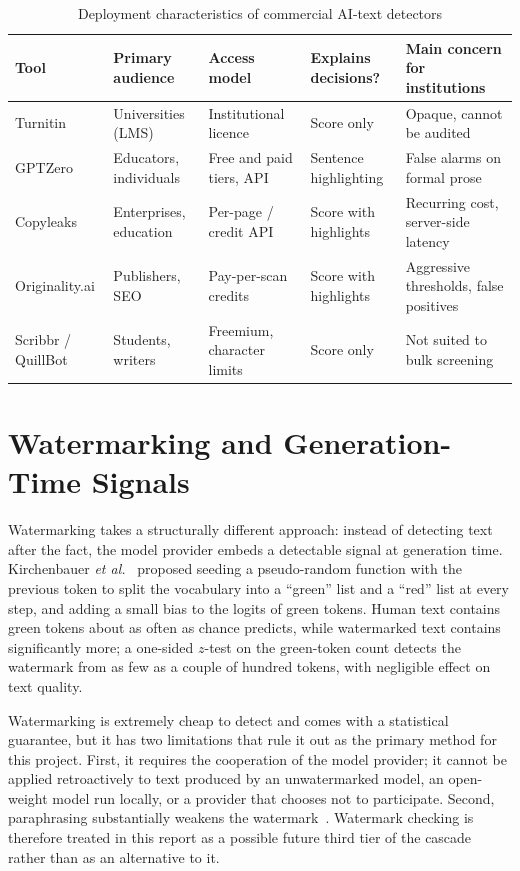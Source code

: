 \begin{table}[H]
\caption{Deployment characteristics of commercial AI-text detectors}
\label{tab:lit-commercial}
\centering
\small
\begin{tabularx}{\textwidth}{|p{2.6cm}|L|L|L|L|}
\hline
\textbf{Tool} & \textbf{Primary audience} & \textbf{Access model} & \textbf{Explains decisions?} & \textbf{Main concern for institutions} \\ \hline
Turnitin & Universities (LMS) & Institutional licence & Score only & Opaque, cannot be audited \\ \hline
GPTZero & Educators, individuals & Free and paid tiers, API & Sentence highlighting & False alarms on formal prose \\ \hline
Copyleaks & Enterprises, education & Per-page / credit API & Score with highlights & Recurring cost, server-side latency \\ \hline
Originality.ai & Publishers, SEO & Pay-per-scan credits & Score with highlights & Aggressive thresholds, false positives \\ \hline
Scribbr / QuillBot & Students, writers & Freemium, character limits & Score only & Not suited to bulk screening \\ \hline
\end{tabularx}
\end{table}

\section{Watermarking and Generation-Time Signals}

Watermarking takes a structurally different approach: instead of detecting
text after the fact, the model provider embeds a detectable signal at
generation time. Kirchenbauer \textit{et al.}~\cite{kirchenbauer2023watermark}
proposed seeding a pseudo-random function with the previous token to split
the vocabulary into a ``green'' list and a ``red'' list at every step, and
adding a small bias to the logits of green tokens. Human text contains green
tokens about as often as chance predicts, while watermarked text contains
significantly more; a one-sided $z$-test on the green-token count detects the
watermark from as few as a couple of hundred tokens, with negligible effect on
text quality.

Watermarking is extremely cheap to detect and comes with a statistical
guarantee, but it has two limitations that rule it out as the primary method
for this project. First, it requires the cooperation of the model provider;
it cannot be applied retroactively to text produced by an unwatermarked model,
an open-weight model run locally, or a provider that chooses not to
participate. Second, paraphrasing substantially weakens the
watermark~\cite{krishna2023paraphrasing,sadasivan2023reliably}. Watermark
checking is therefore treated in this report as a possible future third tier
of the cascade rather than as an alternative to it.

